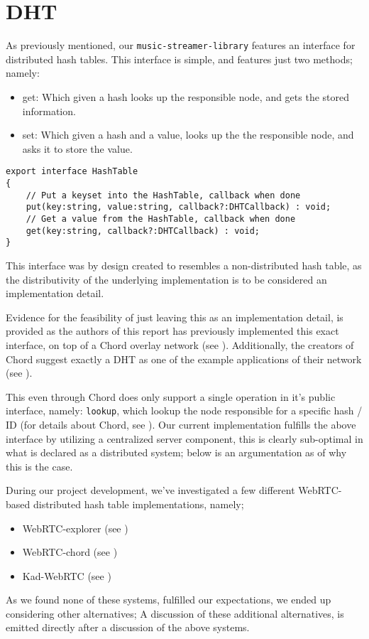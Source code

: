 \section{DHT}
\label{sec:dht}

As previously mentioned, our \verb|music-streamer-library| features an
interface for distributed hash tables. This interface is simple, and features
just two methods; namely:
\begin{itemize}
    \item get: Which given a hash looks up the responsible node, and gets the 
        stored information.
    \item set: Which given a hash and a value, looks up the the responsible
        node, and asks it to store the value.
\end{itemize}
\begin{lstlisting}[caption={TypeScript DHT Hash-Table interface}]
export interface HashTable
{
    // Put a keyset into the HashTable, callback when done
    put(key:string, value:string, callback?:DHTCallback) : void;
    // Get a value from the HashTable, callback when done
    get(key:string, callback?:DHTCallback) : void;
}
\end{lstlisting}
This interface was by design created to resembles a non-distributed hash table,
as the distributivity of the underlying implementation is to be considered an 
implementation detail.

Evidence for the feasibility of just leaving this as an implementation detail,
is provided as the authors of this report has previously implemented this exact
interface, on top of a Chord overlay network (see \citep{Skeen:Chord}).
Additionally, the creators of Chord suggest exactly a \acs{DHT} as one of the example
applications of their network (see \citep{Brunskill:Chord}).

This even through Chord does only support a single operation in it's public 
interface, namely: \verb|lookup|, which lookup the node responsible for a
specific hash / ID (for details about Chord, see \citep{Stoica:Chord}).
\newline\newline
Our current implementation fulfills the above interface by utilizing a
centralized server component, this is clearly sub-optimal in what is declared
as a distributed system; below is an argumentation as of why this is the case.

During our project development, we've investigated a few different WebRTC-based
distributed hash table implementations, namely;
\begin{itemize}
    \item WebRTC-explorer (see \citep{diasdavid:webrtc-explorer})
    \item WebRTC-chord (see \citep{diasdavid:webrtc-chord})
    \item Kad-WebRTC (see \citep{kadtools:kad-webrtc})
\end{itemize}
As we found none of these systems, fulfilled our expectations, we ended up 
considering other alternatives; A discussion of these additional alternatives,
is emitted directly after a discussion of the above systems.

